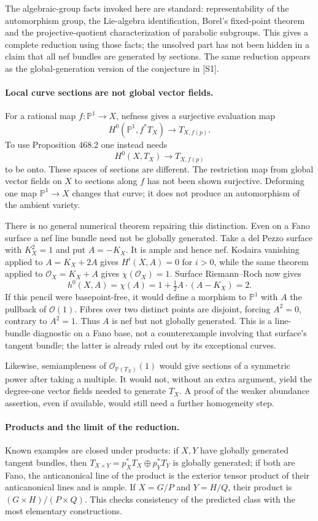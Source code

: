 \documentclass[11pt]{article}
\begin{document}
The algebraic-group facts invoked here are standard: representability
of the automorphism group, the Lie-algebra identification, Borel's
fixed-point theorem and the projective-quotient characterization of
parabolic subgroups. This gives a complete reduction using those
facts; the unsolved part has not been hidden in a claim that all nef
bundles are generated by sections. The same reduction appears as the
global-generation version of the conjecture in [S1].

\paragraph{Local curve sections are not global vector fields.}
For a rational map $f:\mathbb P^1\to X$, nefness gives a surjective
evaluation map
\[
 H^0(\mathbb P^1,f^*T_X)\longrightarrow T_{X,f(p)}.
\]
To use Proposition 468.2 one instead needs
\[
 H^0(X,T_X)\longrightarrow T_{X,f(p)}
\]
to be onto. These spaces of sections are different. The restriction
map from global vector fields on $X$ to sections along $f$ has not
been shown surjective. Deforming one map $\mathbb P^1\to X$ changes
that curve; it does not produce an automorphism of the ambient variety.

There is no general numerical theorem repairing this distinction.
Even on a Fano surface a nef line bundle need not be globally generated.
Take a del Pezzo surface with $K_X^2=1$ and put $A=-K_X$.
It is ample and hence nef. Kodaira vanishing applied to
$A=K_X+2A$ gives $H^i(X,A)=0$ for $i>0$, while the same theorem
applied to $\mathcal O_X=K_X+A$ gives $\chi(\mathcal O_X)=1$.
Surface Riemann--Roch now gives
\[
 h^0(X,A)=\chi(A)=1+\tfrac12 A\cdot(A-K_X)=2.
\]
If this pencil were basepoint-free, it would define a morphism to
$\mathbb P^1$ with $A$ the pullback of $\mathcal O(1)$. Fibres over
two distinct points are disjoint, forcing $A^2=0$, contrary to
$A^2=1$. Thus $A$ is nef but not globally generated.
This is a line-bundle diagnostic on a Fano base, not a counterexample
involving that surface's tangent bundle; the latter is already ruled
out by its exceptional curves.

Likewise, semiampleness of $\mathcal O_{\mathbb P(T_X)}(1)$ would
give sections of a symmetric power after taking a multiple. It would
not, without an extra argument, yield the degree-one vector fields
needed to generate $T_X$. A proof of the weaker abundance assertion,
even if available, would still need a further homogeneity step.

\paragraph{Products and the limit of the reduction.}
Known examples are closed under products: if $X,Y$ have globally
generated tangent bundles, then
$T_{X\times Y}=p_X^*T_X\oplus p_Y^*T_Y$ is globally generated;
if both are Fano, the anticanonical line of the product is the exterior
tensor product of their anticanonical lines and is ample. If
$X=G/P$ and $Y=H/Q$, their product is
$(G\times H)/(P\times Q)$. This checks consistency of the predicted
class with the most elementary constructions.
\end{document}
